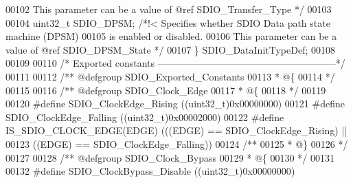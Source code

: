 \begin{DoxyCode}
00102 \textcolor{comment}{                                     This parameter can be a value of @ref SDIO\_Transfer\_Type */}
00103 
00104   uint32\_t SDIO_DPSM;           \textcolor{comment}{/*!< Specifies whether SDIO Data path state machine (DPSM)}
00105 \textcolor{comment}{                                     is enabled or disabled.}
00106 \textcolor{comment}{                                     This parameter can be a value of @ref SDIO\_DPSM\_State */}
00107 \} SDIO\_DataInitTypeDef;
00108 
00109 
00110 \textcolor{comment}{/* Exported constants --------------------------------------------------------*/}
00111 
00112 \textcolor{comment}{/** @defgroup SDIO\_Exported\_Constants}
00113 \textcolor{comment}{  * @\{}
00114 \textcolor{comment}{  */}
00115 
00116 \textcolor{comment}{/** @defgroup SDIO\_Clock\_Edge }
00117 \textcolor{comment}{  * @\{}
00118 \textcolor{comment}{  */}
00119 
00120 \textcolor{preprocessor}{#}\textcolor{preprocessor}{define} \textcolor{preprocessor}{SDIO\_ClockEdge\_Rising}               \textcolor{preprocessor}{(}\textcolor{preprocessor}{(}\textcolor{preprocessor}{uint32\_t}\textcolor{preprocessor}{)}0x00000000\textcolor{preprocessor}{)}
00121 \textcolor{preprocessor}{#}\textcolor{preprocessor}{define} \textcolor{preprocessor}{SDIO\_ClockEdge\_Falling}              \textcolor{preprocessor}{(}\textcolor{preprocessor}{(}\textcolor{preprocessor}{uint32\_t}\textcolor{preprocessor}{)}0x00002000\textcolor{preprocessor}{)}
00122 \textcolor{preprocessor}{#}\textcolor{preprocessor}{define} \textcolor{preprocessor}{IS\_SDIO\_CLOCK\_EDGE}\textcolor{preprocessor}{(}\textcolor{preprocessor}{EDGE}\textcolor{preprocessor}{)} \textcolor{preprocessor}{(}\textcolor{preprocessor}{(}\textcolor{preprocessor}{(}\textcolor{preprocessor}{EDGE}\textcolor{preprocessor}{)} \textcolor{preprocessor}{==} SDIO_ClockEdge_Rising\textcolor{preprocessor}{)} \textcolor{preprocessor}{||}
00123                                   \textcolor{preprocessor}{(}\textcolor{preprocessor}{(}\textcolor{preprocessor}{EDGE}\textcolor{preprocessor}{)} \textcolor{preprocessor}{==} SDIO_ClockEdge_Falling\textcolor{preprocessor}{)}\textcolor{preprocessor}{)}
00124 \textcolor{comment}{/**}
00125 \textcolor{comment}{  * @\}}
00126 \textcolor{comment}{  */}
00127 
00128 \textcolor{comment}{/** @defgroup SDIO\_Clock\_Bypass }
00129 \textcolor{comment}{  * @\{}
00130 \textcolor{comment}{  */}
00131 
00132 \textcolor{preprocessor}{#}\textcolor{preprocessor}{define} \textcolor{preprocessor}{SDIO\_ClockBypass\_Disable}             \textcolor{preprocessor}{(}\textcolor{preprocessor}{(}\textcolor{preprocessor}{uint32\_t}\textcolor{preprocessor}{)}0x00000000\textcolor{preprocessor}{)}

\end{DoxyCode}

